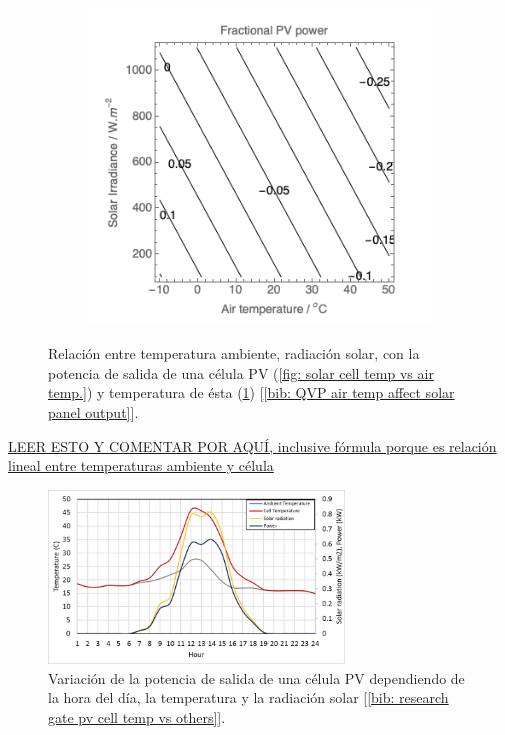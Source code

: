 \documentclass[12pt]{article}
\begin{document}
\begin{figure}[h]
\begin{subfigure}{0.55\textwidth}
			\includegraphics[width=1\linewidth]{img/powerPVCell_airTemp.png}
			\caption{}
			\label{fig:power output of a solar cell vs air temp.}
		\end{subfigure}
		\caption{Relación entre temperatura ambiente, radiación solar, con la potencia de salida de una célula PV (\ref{fig: solar cell temp vs air temp.}) y temperatura de ésta (\ref{fig:power output of a solar cell vs air temp.}) [\ref{bib: QVP air temp affect solar panel output}].}
		\label{fig:solar temp}
	\end{figure}
	
	\pagebreak
	
	\noindent \href{https://www.qpvgroup.org/blog/2019/2/3/how-does-air-temperature-affect-photovoltaic-solar-panel-output}{LEER ESTO Y COMENTAR POR AQUÍ, inclusive fórmula porque es relación lineal entre temperaturas ambiente y célula} \\
	
	\begin{figure}[h]
		\begin{center}
			\includegraphics[width=0.7\textwidth]{img/cellTemp_ambTemp_Irrad_Pow.png}
			\caption{Variación de la potencia de salida de una célula PV dependiendo de la hora del día, la temperatura y la radiación solar [\ref{bib: research gate pv cell temp vs others}].}
			\label{fig:cellTemp_ambTemp_Irrad_Pow}
		\end{center}
	\end{figure}
	
\end{document}
